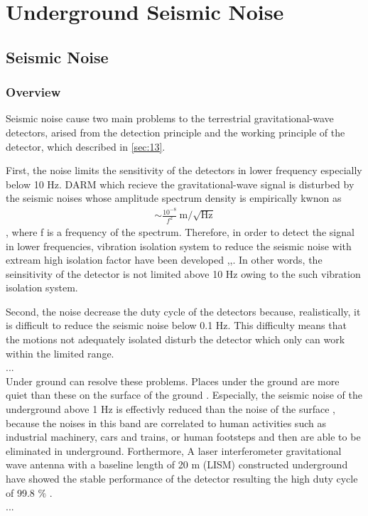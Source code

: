 \chapter{Underground Seismic Noise}

\section{Seismic Noise}
\subsection{Overview}
Seismic noise cause two main problems to the terrestrial gravitational-wave detectors, arised from the detection principle and the working principle of the detector, which described in \cref{sec:13}.

First, the noise limits the sensitivity of the detectors in lower frequency especially below 10 $\mathrm{Hz}$. DARM which recieve the gravitational-wave signal is disturbed by the seismic noises whose amplitude spectrum density is empirically kwnon as 
\begin{eqnarray}
  \sim \frac{10^{-8}}{f^2}\ \mathrm{m}/\sqrt{\mathrm{Hz}}
\end{eqnarray}
, where f is a frequency of the spectrum. Therefore, in order to detect the signal in lower frequencies, vibration isolation system to reduce the seismic noise with extream high isolation factor have been developed \cite{takamori2002low},\cite{sekiguchi2016astudy},\cite{Okutomi2019development}. In other words, the seinsitivity of the detector is not limited above 10 $\mathrm{Hz}$ owing to the such vibration isolation system. 

Second, the noise decrease the duty cycle of the detectors because, realistically, it is difficult to reduce the seismic noise below 0.1 $\mathrm{Hz}$. This difficulty means that the motions not adequately isolated disturb the detector which only can work within the limited range. \\
...\\

Under ground can resolve these problems. Places under the ground are more quiet than these on the surface of the ground \cite{carter1991high}. Especially, the seismic noise of the underground above 1 $\mathrm{Hz}$ is effectivly reduced than the noise of the surface \cite{lcgt2009lcgt}, because the noises in this band are correlated to human activities such as industrial machinery, cars and trains, or human footsteps \cite{bonnefoy2006nature} and then are able to be eliminated in underground. Forthermore, A laser interferometer gravitational wave antenna with a baseline length of 20 $\mathrm{m}$ (LISM) constructed underground have showed the stable performance of the detector resulting the high duty cycle of 99.8 $\%$ \cite{sato2004ultrastable}.\\
...\\

